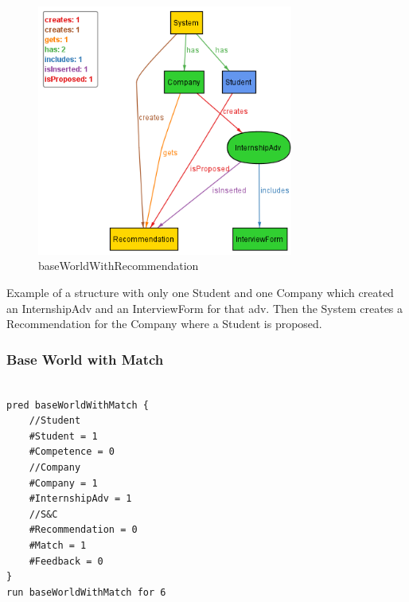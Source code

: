 \begin{figure}[h]
    \centering
    \includegraphics[width=0.75\textwidth]{Images/AlloyModel_images/baseWorldWithRecommendation.png}
    \caption{baseWorldWithRecommendation}
    \label{fig:figure2}
\end{figure}
Example of a structure with only one Student and one Company which created an InternshipAdv and an InterviewForm for that adv. Then the System creates a Recommendation for the Company where a Student is proposed.

\clearpage

\subsubsection{Base World with Match}
\begin{lstlisting}

pred baseWorldWithMatch {
	//Student
	#Student = 1
	#Competence = 0
	//Company
	#Company = 1
	#InternshipAdv = 1
	//S&C
	#Recommendation = 0
	#Match = 1
	#Feedback = 0
}
run baseWorldWithMatch for 6
\end{lstlisting}

